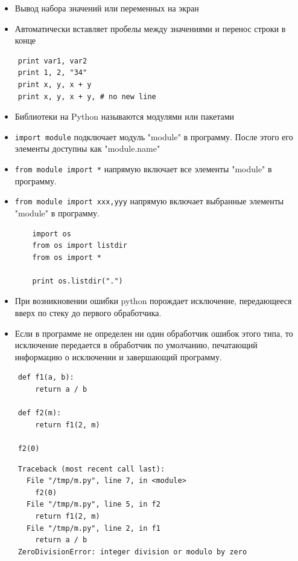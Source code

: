 \documentclass{article}
\begin{document}
\begin{itemize}
    \item Вывод набора значений или переменных на экран
    \item Автоматически вставляет пробелы между значениями и перенос строки в конце
\end{itemize}
\vspace{15pt}
\begin{lstlisting}
    print var1, var2
    print 1, 2, "34"
    print x, y, x + y
    print x, y, x + y, # no new line
\end{lstlisting}
\newpage

\begin{itemize}
    \item Библиотеки на Python называются модулями или пакетами
    \item \lstinline$import module$ подключает модуль "module" в программу. 
    После этого его элементы доступны как "module.name"
    \item \lstinline$from module import *$ напрямую включает все элементы "module" в программу. 
    \item \lstinline$from module import xxx,yyy$
        напрямую включает выбранные элементы "module" в программу. 
\vspace{15pt}

\begin{lstlisting}
    import os
    from os import listdir
    from os import *

    print os.listdir(".")
\end{lstlisting}
\end{itemize}
\newpage

\begin{itemize}
    \item При возникновении ошибки python порождает исключение, 
    			передающееся вверх по стеку до первого обработчика.
    \item Если в программе не определен ни один обработчик ошибок этого типа, то исключение
    			передается в обработчик по умолчанию, печатающий информацию о исключении
    			и завершающий программу.
\end{itemize}

{
\Large
\begin{lstlisting}
    def f1(a, b):
        return a / b

    def f2(m):
        return f1(2, m)

    f2(0)
\end{lstlisting}

\begin{verbatim}
    Traceback (most recent call last):
      File "/tmp/m.py", line 7, in <module>
        f2(0)
      File "/tmp/m.py", line 5, in f2
        return f1(2, m)
      File "/tmp/m.py", line 2, in f1
        return a / b
    ZeroDivisionError: integer division or modulo by zero
\end{verbatim}
}
\end{document}
